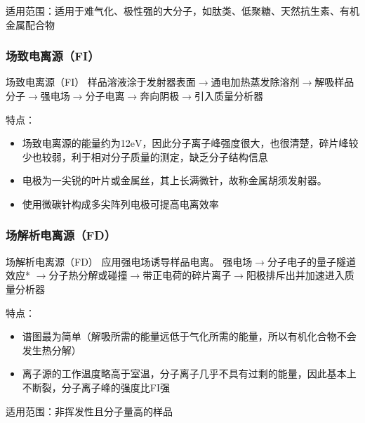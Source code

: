     适用范围：适用于难气化、极性强的大分子，如肽类、低聚糖、天然抗生素、有机金属配合物    
    
    \subsubsection*{场致电离源（FI）}
   \begin{definition*}{场致电离源（FI）}
    样品溶液涂于发射器表面$\rightarrow$通电加热蒸发除溶剂$\rightarrow$解吸样品分子$\rightarrow$强电场$\rightarrow$分子电离$\rightarrow$奔向阴极$\rightarrow$引入质量分析器
   \end{definition*}
    特点：
    \begin{itemize}
        \item 场致电离源的能量约为12$\mathrm{eV}$，因此分子离子峰强度很大，也很清楚，碎片峰较少也较弱，利于相对分子质量的测定，缺乏分子结构信息
        \item 电极为一尖锐的叶片或金属丝，其上长满微针，故称金属胡须发射器。
        \item 使用微碳针构成多尖阵列电极可提高电离效率
    \end{itemize}

    \subsubsection*{场解析电离源（FD）}
    \begin{definition*}{场解析电离源（FD）}
        应用强电场诱导样品电离。
    强电场$\rightarrow$分子电子的量子隧道效应* $\rightarrow$分子热分解或碰撞$\rightarrow$带正电荷的碎片离子$\rightarrow$阳极排斥出并加速进入质量分析器
    \end{definition*}
   
    特点：
    \begin{itemize}
        \item 谱图最为简单（解吸所需的能量远低于气化所需的能量，所以有机化合物不会发生热分解）
        \item 离子源的工作温度略高于室温，分子离子几乎不具有过剩的能量，因此基本上不断裂，分子离子峰的强度比FI强
    \end{itemize}

    适用范围：非挥发性且分子量高的样品


